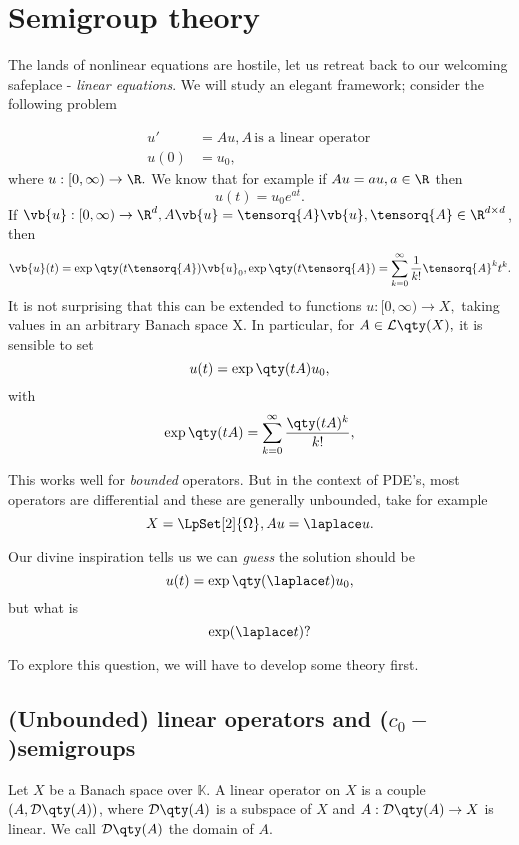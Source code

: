 
\section{Semigroup theory}
\label{sec:semigroups}

The lands of nonlinear equations are hostile, let us retreat back to our welcoming safeplace - \textit{linear equations}. We will study an elegant framework; consider the following problem

\begin{align*}
	u' &= Au, A \, \text{is a linear operator} \,\\
	u(0) &= u_0,
\end{align*}
where $u:[0, \infty) \to \R.$ We know that for example if $Au = au, a \in \R$ then
\[
	u(t) = u_0 e^{at}.
\]
If $\vb{u}: [0,\infty) \to \R^{d}, A\vb{u} = \tensorq{A}\vb{u}, \tensorq{A} \in \R^{d \times d}$, then
\[
	\vb{u}(t) = \exp\qty(t\tensorq{A})\vb{u}_0, \exp\qty(t \tensorq{A}) = \sum_{k=0}^{\infty}\frac{1}{k!}\tensorq{A}^k t^k.
\]
It is not surprising that this can be extended to functions $u:[0, \infty) \to X,$ taking values in an arbitrary Banach space X. In particular, for $A \in \mathcal{L}\qty(X), $ it is sensible to set
\[
	u(t) = \exp\qty(tA)u_0,
\]
with
\[
	\exp\qty(tA) = \sum_{k=0}^{\infty}\frac{\qty(tA)^k}{k!},
\]

This works well for \textit{bounded} operators. But in the context of PDE's, most operators are differential and these are generally unbounded, take for example 
\[
	X = \LpSet[2]{\Omega}, Au = \laplace u.
\]

Our divine inspiration tells us we can \textit{guess} the solution should be
\[
	u(t) = \exp\qty(\laplace t)u_0,
\]
but what is
\[
	\exp(\laplace t)?
\]

To explore this question, we will have to develop some theory first.

\subsection{(Unbounded) linear operators and ($c_0-$)semigroups}
\label{sec:linops_semigroups}

\begin{definition}
Let $X$ be a Banach space over $\mathbb{K}$. A linear operator on $X$ is a couple $(A, \mathcal{D}\qty(A))$, where $\mathcal{D}\qty(A)$ is a subspace of $X$ and $A: \mathcal{D}\qty(A) \to X$ is linear. We call $\mathcal{D}\qty(A)$ the domain of $A.$
\end{definition}

